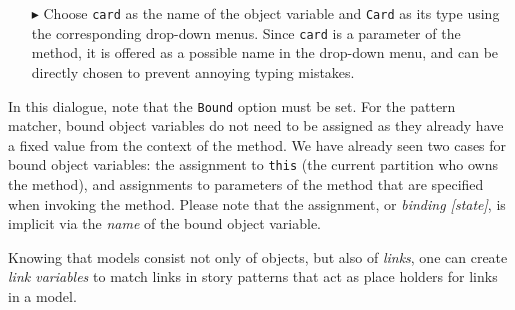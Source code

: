 \begin{itemize}
\item[$\blacktriangleright$] Choose \texttt{card} as the name of the object variable and \texttt{Card} as its type using the corresponding drop-down menus.
Since \texttt{card} is a parameter of the method, it is offered as a possible name in the drop-down menu, and can be directly chosen to prevent annoying typing mistakes.

\end{itemize}

In this dialogue, note that the \texttt{Bound} option must be set. For the pattern matcher, bound object variables do not need to be assigned as they already
have a fixed value from the context of the method.   We have already seen two cases  for bound object variables: the assignment to \texttt{this} (the current
partition who owns the method), and assignments to parameters of the method that  are specified when invoking the method. Please note that the assignment, or
\emph{binding [state]}, is implicit via the \emph{name} of the bound object variable.

Knowing that models consist not only of objects, but also of \emph{links}, one can create \emph{link variables} to match links in story
patterns that act as place holders for links in a model.


